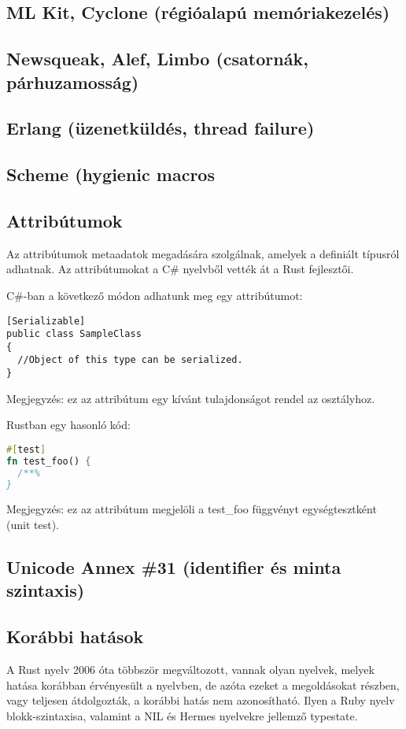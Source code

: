 \subsection{ML Kit, Cyclone (régióalapú memóriakezelés)}
\subsection{Newsqueak, Alef, Limbo (csatornák, párhuzamosság)}
\subsection{Erlang (üzenetküldés, thread failure)}
\subsection{Scheme (hygienic macros}

\subsection{Attribútumok}
Az attribútumok metaadatok megadására szolgálnak, amelyek a definiált típusról adhatnak. Az attribútumokat a C\# nyelvből vették át a Rust fejlesztői.

C\#-ban a következő módon adhatunk meg egy attribútumot:
\begin{lstlisting}
[Serializable]
public class SampleClass
{
  //Object of this type can be serialized.
}
\end{lstlisting}
Megjegyzés: ez az attribútum egy kívánt tulajdonságot rendel az osztályhoz.

Rustban egy hasonló kód:
\begin{lstlisting}[language=Rust, style=boxed]
#[test]
fn test_foo() {
  /**%
}
\end{lstlisting}
Megjegyzés: ez az attribútum megjelöli a test\_foo függvényt egységtesztként (unit test).

\subsection{Unicode Annex \#31 (identifier és minta szintaxis)}

\subsection{Korábbi hatások}
A Rust nyelv 2006 óta többször megváltozott, vannak olyan nyelvek, melyek hatása korábban érvényesült a nyelvben, de azóta ezeket a megoldásokat részben, vagy teljesen átdolgozták, a korábbi hatás nem azonosítható. Ilyen a Ruby nyelv blokk-szintaxisa, valamint a NIL és Hermes nyelvekre jellemző typestate.

